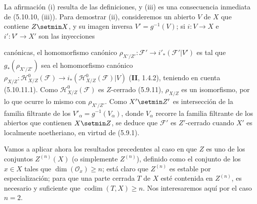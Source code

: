 La afirmación (i) resulta de las definiciones, y (iii) es una consecuencia
inmediata de (5.10.10, (iii)). Para demostrar (ii), consideremos un abierto
$V$ de $X$ que contiene $Z\setmin X$, y su imagen inversa $V'=g^{-1}(V)$; si
$i:V\to X$ e $i':V'\to X'$ son las inyecciones


canónicas, el homomorfismo canónico
$\rho_{X'/Z'}:\mathcal F'\to i'_*(\mathcal F'|V')$ es tal que
$g_*(\rho_{X'/Z'})$ sea el homomorfismo canónico
$\rho_{X/Z}:\mathcal H^0_{X/Z}(\mathcal F)
\to i_*(\mathcal H^0_{X/Z}(\mathcal F)|V)$
(\textbf{II}, 1.4.2), teniendo en cuenta (5.10.11.1). Como
$\mathcal H^0_{X/Z}(\mathcal F)$ es $Z$-cerrado (5.9.11), $\rho_{X/Z}$ es un
isomorfismo, por lo que ocurre lo mismo con $\rho_{X'/Z'}$. Como $X'\setmin Z'$ es
intersección de la familia filtrante de los $V'_\alpha=g^{-1}(V_\alpha)$,
donde $V_\alpha$ recorre la familia filtrante de los abiertos que contienen
$X\setmin Z$, se deduce que $\mathcal F'$ es $Z'$-cerrado cuando $X'$ es localmente
noetheriano, en virtud de (5.9.1).

\begin{env}[5.10.13]
\label{IV.2.s5.10.13-fr}
Vamos a aplicar ahora los resultados precedentes al caso en que $Z$ es uno de
los conjuntos $Z^{(n)}(X)$ (o simplemente $Z^{(n)}$), definido como el conjunto
de los $x\in X$ tales que $\dim(\mathcal O_x)\geq n$; está claro que
$Z^{(n)}$ es estable por especialización; para que una parte cerrada $T$ de $X$
esté contenida en $Z^{(n)}$, es necesario y suficiente que
$\operatorname{codim}(T,X)\geq n$. Nos interesaremos aquí por el caso $n=2$.
\end{env}
